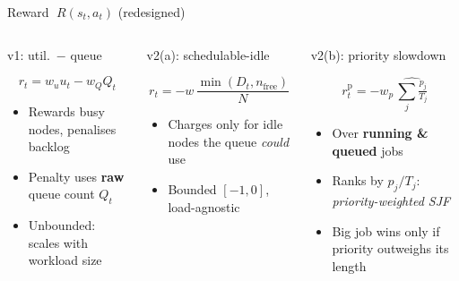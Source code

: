 \begin{frame}{Reward $\;R(s_t, a_t)$ \hfill \small\textcolor{SoftCoral}{(redesigned)}}
  \footnotesize
  \begin{columns}[T,onlytextwidth]
        \begin{block}{v1: util.\ $-$ queue}
        \begin{minipage}[t][4.0cm]{\linewidth}
        $$ r_t = w_u u_t - w_Q Q_t $$
        \begin{itemize}\setlength\itemsep{2pt}
          \item Rewards busy nodes, penalises backlog
          \item Penalty uses \textbf{raw} queue count $Q_t$
          \item \alert{Unbounded}: scales with workload size
        \end{itemize}
        \end{minipage}
      \end{block}

    \hfill
      \begin{block}{v2(a): schedulable-idle}
        \begin{minipage}[t][4.0cm]{\linewidth}
        $$ r_t = -w\,\frac{\min(D_t, n_{\text{free}})}{N} $$
        \begin{itemize}\setlength\itemsep{2pt}
          \item Charges only for idle nodes the queue \emph{could} use
          \item Bounded $[-1,0]$, \textcolor{DeepBlue}{load-agnostic}
        \end{itemize}
        \end{minipage}
      \end{block}

    \hfill
      \begin{block}{v2(b): priority slowdown}
        \begin{minipage}[t][4.0cm]{\linewidth}
        $$ r^{\text{p}}_t = -w_p\,\widehat{\textstyle\sum_{j} \tfrac{p_j}{T_j}} $$
        \begin{itemize}\setlength\itemsep{2pt}
          \item Over \textbf{running \& queued} jobs
          \item Ranks by $p_j/T_j$: \emph{priority-weighted SJF}
          \item Big job wins only if priority outweighs its length
        \end{itemize}
        \end{minipage}
      \end{block}
  \end{columns}


\end{frame}
